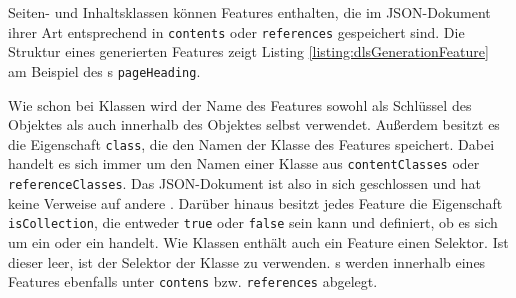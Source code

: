     Seiten- und Inhaltsklassen können Features enthalten,
    die im JSON-Dokument ihrer Art entsprechend in \texttt{contents}
    oder \texttt{references} gespeichert sind.
    Die Struktur eines generierten Features zeigt Listing
    \ref{listing:dlsGenerationFeature} am Beispiel des {\contentFeature}s \texttt{pageHeading}.

    

    Wie schon bei Klassen wird der Name des Features sowohl als Schlüssel des Objektes
    als auch innerhalb des Objektes selbst verwendet.
    Außerdem besitzt es die Eigenschaft \texttt{class},
    die den Namen der Klasse des Features speichert. Dabei handelt es sich immer
    um den Namen einer Klasse aus \texttt{contentClasses} oder \texttt{referenceClasses}.
    Das JSON-Dokument ist also in sich geschlossen und hat keine Verweise auf andere {\resources}.
    Darüber hinaus besitzt jedes Feature die Eigenschaft \texttt{isCollection},
    die entweder \texttt{true} oder \texttt{false} sein kann und definiert,
    ob es sich um ein {\scalarFeature} oder ein {\collectionFeature} handelt.
    Wie Klassen enthält auch ein Feature einen Selektor.
    Ist dieser leer, ist der Selektor der Klasse zu verwenden.
    {\childFeature}s werden innerhalb eines Features ebenfalls unter \texttt{contens} bzw.
    \texttt{references} abgelegt.